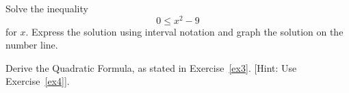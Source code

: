 \documentclass[12pt]{amsart}
\begin{document}
\begin{thm}[16 Points]\label{ex11}
  Solve the inequality $$0 \leq x^2 - 9$$ for $x$.
  Express the solution using interval notation and graph the solution on the number line.
\end{thm}

\newpage

\begin{thm}\label{bonus}
  Derive the Quadratic Formula, as stated in Exercise~\ref{ex3}.
  [Hint: Use Exercise~\ref{ex4}].
\end{thm}
\end{document}

